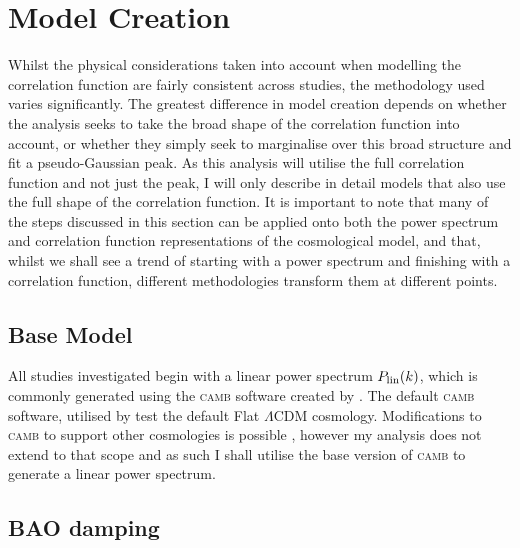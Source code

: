 \documentclass[titlesmallcaps, examinerscopy, copyrightpage]{uqthesis}
\newcommand{\camb}{\textsc{camb}}
\begin{document}
\section{Model Creation}

Whilst the physical considerations taken into account when modelling the correlation function are fairly consistent across studies, the methodology used varies significantly. The greatest difference in model creation depends on whether the analysis seeks to take the broad shape of the correlation function into account, or whether they simply seek to marginalise over this broad structure and fit a pseudo-Gaussian peak. As this analysis will utilise the full correlation function and not just the peak, I will only describe in detail models that also use the full shape of the correlation function. It is important to note that many of the steps discussed in this section can be applied onto both the power spectrum and correlation function representations of the cosmological model, and that, whilst we shall see a trend of starting with a power spectrum and finishing with a correlation function, different methodologies transform them at different points. 

\subsection{Base Model}
All studies investigated begin with a linear power spectrum $P_{\rm{lin}}(k)$, which is commonly generated using the \camb{} software created by \citet{Lewis2000}. The default \camb{} software, utilised by \citet{ChuangWang2012,BlakeDavis2011} test the default Flat $\Lambda$CDM cosmology. Modifications to \camb{} to support other cosmologies is possible \citep{SanchezScoccola2012, FangHuLewis2008, KeislerReichardt2011, ConleyGuySullivan2011}, however my analysis does not extend to that scope and as such I shall utilise the base version of \camb{} to generate a linear power spectrum.

\subsection{BAO damping}
\end{document}
